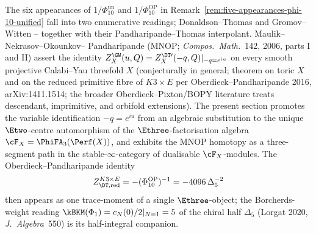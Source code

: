 The six appearances of \(1/\Phi_{10}^{\mathrm{un}}\) and \(1/\Phi_{10}^{\mathrm{OP}}\) in Remark~\ref{rem:five-appearances-phi-10-unified}
fall into two enumerative readings; Donaldson--Thomas and Gromov--Witten --
together with their Pandharipande--Thomas interpolant. Maulik--Nekrasov--Okounkov--%
Pandharipande (MNOP; \emph{Compos.~Math.}~142, 2006, parts I and II) assert the
identity $Z^{\GW}_X(u, Q) = Z^{\DT\prime}_X(-q, Q)|_{-q = e^{iu}}$ on every
smooth projective Calabi--Yau threefold $X$ (conjecturally in general; theorem
on toric $X$ and on the reduced primitive fibre of $K3\times E$ per
Oberdieck--Pandharipande 2016, arXiv:1411.1514; the broader
Oberdieck--Pixton/BOPY literature treats descendant, imprimitive, and
orbifold extensions). The present section promotes the
variable identification $-q = e^{iu}$ from an algebraic substitution to the
unique $\Etwo$-centre automorphism of the $\Ethree$-factorisation algebra
$\cF_X = \PhiFA_3(\Perf(X))$, and exhibits the MNOP homotopy as a three-segment
path in the stable-$\infty$-category of dualisable $\cF_X$-modules. The
Oberdieck--Pandharipande identity
\[
Z^{K3\times E}_{\DT, \mathrm{red}}
=
-(\Phi_{10}^{\mathrm{OP}})^{-1}
=
-4096\,\Delta_5^{-2}
\]
then appears as one trace-moment of a single $\Ethree$-object; the
Borcherds-weight reading $\kBKM(\Phi_1) = c_N(0)/2|_{N=1} = 5$ of the chiral half
$\Delta_5$ (Lorgat 2020, \emph{J.~Algebra}~550) is its half-integral companion.

